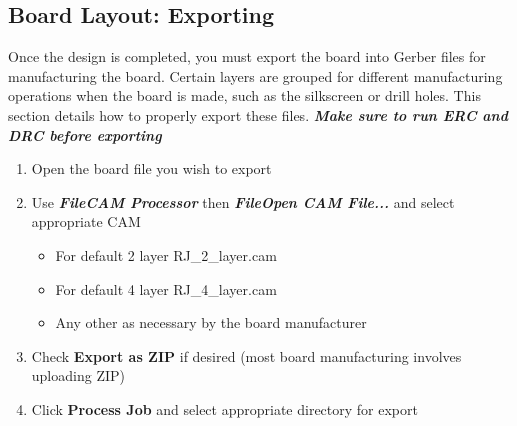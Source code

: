 \documentclass{article}
\begin{document}
\subsection{Board Layout: Exporting}
Once the design is completed, you must export the board into Gerber files for manufacturing the board. Certain layers are grouped for different manufacturing operations when the board is made, such as the silkscreen or drill holes. This section details how to properly export these files. \textit{\textbf{Make sure to run ERC and DRC before exporting}}
\begin{enumerate}
    \item Open the board file you wish to export
    \item Use \textit{\textbf{File\textrightarrow CAM Processor}} then \textit{\textbf{File\textrightarrow Open CAM File...}} and select appropriate CAM
    \begin{itemize}
        \item For default 2 layer \textrightarrow RJ\_2\_layer.cam
        \item For default 4 layer \textrightarrow RJ\_4\_layer.cam
        \item Any other as necessary by the board manufacturer
    \end{itemize}
    \item Check \textbf{Export as ZIP} if desired (most board manufacturing involves uploading ZIP)
    \item Click \textbf{Process Job} and select appropriate directory for export
\end{enumerate}


\begin{versionhistory}
\end{versionhistory}
\end{document}
